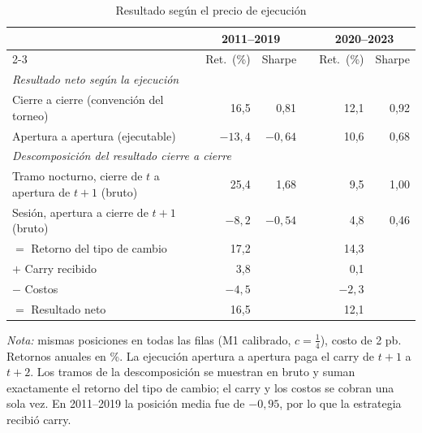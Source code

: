 \documentclass[11pt,a4paper]{article}
\begin{document}
\begin{table}[htbp]\centering\small
\caption{Resultado según el precio de ejecución}\label{tab:ejecucion}
\begin{threeparttable}
\begin{tabular}{l rr c rr}
\toprule
 & \multicolumn{2}{c}{2011--2019} & & \multicolumn{2}{c}{2020--2023} \\
\cmidrule{2-3}\cmidrule{5-6}
 & Ret.\ (\%) & Sharpe & & Ret.\ (\%) & Sharpe \\
\midrule
\multicolumn{6}{l}{\emph{Resultado neto según la ejecución}} \\
Cierre a cierre (convención del torneo) & 16,5 & 0,81 & & 12,1 & 0,92 \\
Apertura a apertura (ejecutable) & $-13{,}4$ & $-0{,}64$ & & 10,6 & 0,68 \\
\midrule
\multicolumn{6}{l}{\emph{Descomposición del resultado cierre a cierre}} \\
Tramo nocturno, cierre de \(t\) a apertura de \(t+1\) (bruto) & 25,4 & 1,68 & & 9,5 & 1,00 \\
Sesión, apertura a cierre de \(t+1\) (bruto) & $-8{,}2$ & $-0{,}54$ & & 4,8 & 0,46 \\
\quad $=$ Retorno del tipo de cambio & 17,2 & & & 14,3 & \\
\quad $+$ Carry recibido & 3,8 & & & 0,1 & \\
\quad $-$ Costos & $-4{,}5$ & & & $-2{,}3$ & \\
\quad $=$ Resultado neto & 16,5 & & & 12,1 & \\
\bottomrule
\end{tabular}
\begin{tablenotes}\footnotesize
\item \emph{Nota:} mismas posiciones en todas las filas (M1 calibrado, \(c=\tfrac14\)), costo de 2 pb. Retornos anuales en \%. La ejecución apertura a apertura paga el carry de \(t+1\) a \(t+2\). Los tramos de la descomposición se muestran en bruto y suman exactamente el retorno del tipo de cambio; el carry y los costos se cobran una sola vez. En 2011--2019 la posición media fue de $-0{,}95$, por lo que la estrategia recibió carry.
\end{tablenotes}
\end{threeparttable}
\end{table}
\end{document}
